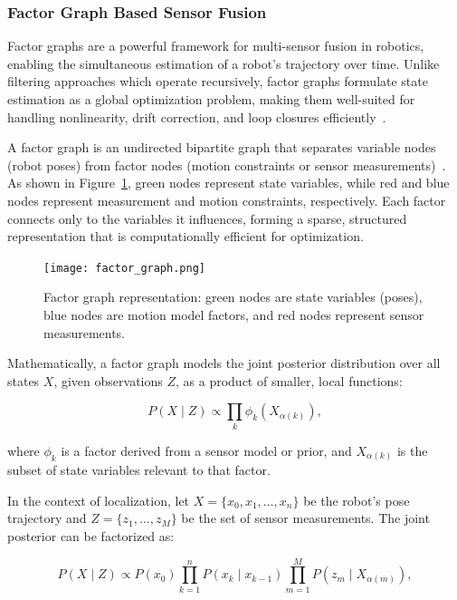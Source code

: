 \subsubsection{Factor Graph Based Sensor Fusion}

Factor graphs are a powerful framework for multi-sensor fusion in robotics, enabling the simultaneous estimation of a robot’s trajectory over time. Unlike filtering approaches which operate recursively, factor graphs formulate state estimation as a global optimization problem, making them well-suited for handling nonlinearity, drift correction, and loop closures efficiently~\cite{cadena2016past,dellaert2017factor}.

A factor graph is an undirected bipartite graph that separates variable nodes (robot poses) from factor nodes (motion constraints or sensor measurements)~\cite{kschischang1998factor}. As shown in Figure~\ref{fig:factor_graph}, green nodes represent state variables, while red and blue nodes represent measurement and motion constraints, respectively. Each factor connects only to the variables it influences, forming a sparse, structured representation that is computationally efficient for optimization.

\begin{figure}[ht]
    \centering
    \texttt{[image: factor\_graph.png]}
    \caption{Factor graph representation: green nodes are state variables (poses), blue nodes are motion model factors, and red nodes represent sensor measurements.}
    \label{fig:factor_graph}
\end{figure}

Mathematically, a factor graph models the joint posterior distribution over all states $X$, given observations $Z$, as a product of smaller, local functions:

\begin{equation}
P(X \mid Z) \propto \prod_k \phi_k(X_{\alpha(k)}),
\label{eq:fg_joint}
\end{equation}

where $\phi_k$ is a factor derived from a sensor model or prior, and $X_{\alpha(k)}$ is the subset of state variables relevant to that factor.

In the context of localization, let $X = \{x_0, x_1, \dots, x_n\}$ be the robot’s pose trajectory and $Z = \{z_1, \dots, z_M\}$ be the set of sensor measurements. The joint posterior can be factorized as:

\begin{equation}
P(X \mid Z) \propto P(x_0) \prod_{k=1}^n P(x_k \mid x_{k-1}) \prod_{m=1}^M P(z_m \mid X_{\alpha(m)}),
\label{eq:fg_bayes}
\end{equation}


